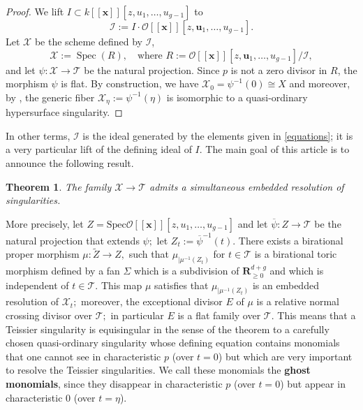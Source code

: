 \documentclass[11pt, a4paper]{amsart}
\numberwithin{equation}{section}
\theoremstyle{plain}
\newtheorem{Thm}{Theorem}[section]
\theoremstyle{definition}
\theoremstyle{remark}
\newcommand{\cI}{\mathcal{I}}
\newcommand{\cO}{\mathcal{O}}
\newcommand{\cT}{\mathcal{T}}
\newcommand{\cX}{\mathcal{X}}
\newcommand{\0}{{\boldsymbol 0}}
\renewcommand{\u}{{\boldsymbol u}}
\newcommand{\x}{{\boldsymbol x}}
\newcommand{\Spec}{\operatorname{Spec}}
\newcommand{\kk}{k}
\begin{document}
\begin{proof}
	We lift $ I \subset k[[\x]][z,u_{1},\ldots,u_{g-1}] $ to
	\[
		\cI := I \cdot \cO[[\x]][z,\u_{1},\ldots,u_{g-1}].
	\]
	Let $ \cX $ be the scheme defined by $ \cI $,
	\[
		\cX := \Spec (R),
		\ \ \ 
		\mbox{ where } 
		R := \cO[[\x]][z,\u_{1},\ldots,u_{g-1}]/ \cI,
	\] 
	and let $ \psi \colon \cX \to \cT $ be the natural projection.
	Since $ p $ is not a zero divisor in $ R $,
	the morphism $ \psi $ is flat. 
	By construction, we have $ \cX_0=\psi^{-1}(0) \cong X $ 
	and moreover, by \cite{MS}, the generic fiber $ \cX_\eta:=\psi^{-1}(\eta) $ is isomorphic to a quasi-ordinary hypersurface singularity. 
\end{proof}

In other terms, $\cI$ is the ideal generated by the elements given in \eqref{equations}; it is a very particular lift of the defining ideal of $I.$ The main goal of this article is to announce the following result. 

\begin{Thm}\label{main1}The family $\cX\longrightarrow \cT$  admits a simultaneous embedded resolution of singularities.
\end{Thm}
More precisely, let $Z=\mathrm{Spec}\cO[[\x]][z,u_1,\ldots,u_{g-1}]$ and let $\overline{\psi}:Z\to \cT$ be the natural projection that extends $\psi;$ let $Z_t:={\overline{\psi}}^{-1}(t).$ There exists a birational proper morphism 
$\mu:\widetilde{Z}\longrightarrow Z,$ such that  $\mu_{\mid\mu^{-1}(Z_t)}$ for $t\in \cT$ is a birational toric morphism defined by a fan $\Sigma$ which is a subdivision of $\mathbf{R}_{\geq 0}^{d+g}$ and which is independent of $t\in \cT.$ 
This map $\mu$ satisfies that  $\mu_{\mid\mu^{-1}(Z_t)}$ is an embedded resolution of $\cX_t;$ moreover, the exceptional divisor $E$ of $\mu$ is a relative normal crossing divisor over $\cT;$ in particular $E$ is a flat family over $\cT.$ This means that a Teissier singularity is equisingular in the sense of the theorem to a carefully chosen quasi-ordinary singularity 
whose defining equation contains monomials that one cannot see in characteristic $p$ (over $t=0$) but which are very important to resolve the Teissier singularities. We call these monomials the \textbf{ghost monomials}, since they disappear in characteristic $p$ (over $t=0$) but appear in characteristic $0$ (over $t=\eta$).
\end{document}
